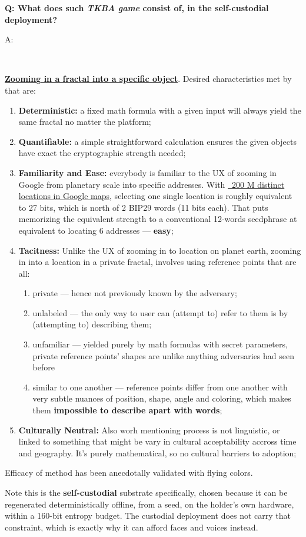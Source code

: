 \documentclass[12pt,a4paper]{article}
\newenvironment{question}[1]{%
  \vspace{0.8em}\noindent\textbf{Q: #1}\par
  \vspace{0.2em}\noindent\begin{itshape}A:\end{itshape}~%
}{\vspace{0.8em}}
\newcommand{\gmaps}{https://blog.google/products/maps/15-years-of-mapping-the-world-makes-search-better/}
\begin{document}
\begin{question}{What does such \textit{TKBA game} consist of, in the self-custodial deployment?}
\href{https://www.youtube.com/watch?v=bI8fiGmpHR0}{\textbf{Zooming in a fractal into a specific object}}. Desired characteristics met by that are:
\begin{enumerate}
 \item \textbf{Deterministic:} a fixed math formula with a given input will always yield the same fractal no matter the platform;
 \item \textbf{Quantifiable:} a simple straightforward calculation ensures the given objects have exact the cryptographic strength needed;
 \item \textbf{Familiarity and Ease:} everybody is familiar to the UX of zooming in Google from planetary scale into specific addresses. With \href{\gmaps}{~200 M distinct locations in Google maps}, selecting one single location is roughly equivalent to 27 bits, which is north of 2 BIP29 words (11 bits each). That puts memorizing the equivalent strength to a conventional 12-words seedphrase at equivalent to locating 6 addresses --- \textbf{easy};
 \item \textbf{Tacitness:} Unlike the UX of zooming in to location on planet earth, zooming in into a location in a private fractal, involves using reference points that are all:
 \begin{enumerate}
  \item private --- hence not previously known by the adversary;
  \item unlabeled --- the only way to user can (attempt to) refer to them is by (attempting to) describing them;
  \item unfamiliar --- yielded purely by math formulas with secret parameters, private reference points' shapes are unlike anything adversaries had seen before
  \item similar to one another --- reference points differ from one another with very subtle nuances of position, shape, angle and coloring, which makes them \textbf{impossible to describe apart with words};
 \end{enumerate}
 \item \textbf{Culturally Neutral:} Also worh mentioning process is not linguistic, or linked to something that might be vary in cultural acceptability accross time and geography. It's purely mathematical, so no cultural barriers to adoption;
\end{enumerate}
Efficacy of method has been anecdotally validated with flying colors.

Note this is the \textbf{self-custodial} substrate specifically, chosen because it can be regenerated deterministically offline, from a seed, on the holder's own hardware, within a 160-bit entropy budget. The custodial deployment does not carry that constraint, which is exactly why it can afford faces and voices instead.
\end{question}
\end{document}
